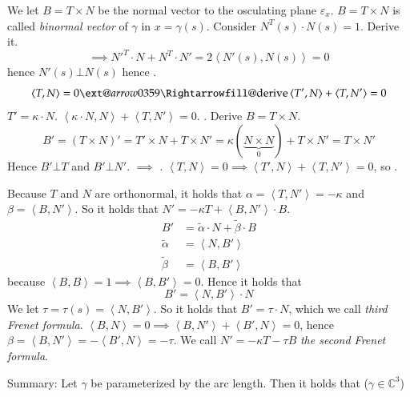 \documentclass{article}
\makeatletter
\newcommand{\angel}[1]{\left\langle#1\right\rangle}
\newcommand{\xRightarrow}[2][]{\ext@arrow 0359\Rightarrowfill@{#1}{#2}}
\makeatother
\begin{document}
We let $B = T \times N$ be the normal vector to the osculating plane $\varepsilon_x$.
$B = T \times N$ is called \emph{binormal vector} of $\gamma$ in $x = \gamma(s)$.
Consider $N^T(s) \cdot N(s) = 1$. Derive it.
\[ \implies N'^T \cdot N + N^T \cdot N' = 2 \angel{N'(s), N(s)} = 0 \]
hence $N'(s) \bot N(s)$ hence .
\[ \angel{T, N} = 0 \xRightarrow{\text{derive}} \angel{T', N} + \angel{T, N'} = 0 \]
$T' = \kappa \cdot N$. $\angel{\kappa \cdot N, N} + \angel{T, N'} = 0$.
\fbox{$\angel{T, N'} = -\kappa$}.
Derive $B = T \times N$.
\[ B' = (T \times N)' = T' \times N + T \times N' = \kappa(\underbrace{N \times N}_{0}) + T \times N' = T \times N' \]
Hence $B' \bot T$ and $B' \bot N'$. $\implies$ .
$\angel{T, N} = 0 \implies \angel{T', N} + \angel{T, N'} = 0$, so \fbox{$\angel{N', T} = -\angel{T', N}$}.

Because $T$ and $N$ are orthonormal, it holds that $\alpha = \angel{T, N'} = -\kappa$ and $\beta = \angel{B, N'}$.
So it holds that $N' = -\kappa T + \angel{B, N'} \cdot B$.
\begin{align*}
  B' &= \tilde\alpha \cdot N + \tilde\beta \cdot B \\
  \tilde\alpha &= \angel{N, B'} \\
  \tilde\beta &= \angel{B, B'}
\end{align*}
because $\angel{B, B} = 1 \implies \angel{B, B'} = 0$.
Hence it holds that
\[ B' = \angel{N, B'} \cdot N \]
We let $\tau = \tau(s) = \angel{N, B'}$.
So it holds that $B' = \tau \cdot N$, which we call \emph{third Frenet formula}.
$\angel{B, N} = 0 \implies \angel{B, N'} + \angel{B', N} = 0$,
hence $\beta = \angel{B, N'} = -\angel{B', N} = -\tau$.
We call $N' = -\kappa T - \tau B$ \emph{the second Frenet formula}.

Summary: Let $\gamma$ be parameterized by the arc length.
Then it holds that ($\gamma \in \mathbb C^3$)
\end{document}
